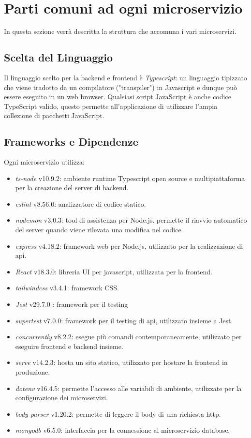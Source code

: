 \documentclass{report}
\begin{document}
\section{Parti comuni ad ogni microservizio}

In questa sezione verrà descritta la struttura che accomuna i vari microservizi.

\subsection{Scelta del Linguaggio}

Il linguaggio scelto per la backend e frontend è \textit{Typescript}: un linguaggio tipizzato che viene tradotto da un compilatore ("transpiler") in Javascript e dunque può essere eseguito in un web browser. Qualsiasi script JavaScript è anche codice TypeScript valido, questo permette all'applicazione di utilizzare l'ampia collezione di pacchetti JavaScript.

\subsection{Frameworks e Dipendenze}

Ogni microservizio utilizza:
\begin{itemize}
	\item \textit{ts-node} v10.9.2: ambiente runtime Typescript open source e multipiattaforma per la creazione del server di backend.
	\item \textit{eslint} v8.56.0: analizzatore di codice statico.
	\item \textit{nodemon} v3.0.3: tool di assistenza per Node.js. permette il riavvio automatico del server quando viene rilevata una modifica nel codice.
	\item \textit{express} v4.18.2: framework web per Node.js, utilizzato per la realizzazione di api.
	\item \textit{React} v18.3.0: libreria UI per javascript, utilizzata per la frontend.
	\item \textit{tailwindcss} v3.4.1: framework CSS.
	\item \textit{Jest} v29.7.0 : framework per il testing
	\item \textit{supertest} v7.0.0: framework per il testing di api, utilizzato insieme a Jest. 
	\item \textit{concurrently} v8.2.2: esegue più comandi contemporaneamente, utilizzato per eseguire frontend e backend insieme.
	\item \textit{serve} v14.2.3: hosta un sito statico, utilizzato per hostare la frontend in produzione.
	\item \textit{dotenv} v16.4.5: permette l'accesso alle variabili di ambiente, utilizzate per la configurazione dei microservizi.
	\item \textit{body-parser} v1.20.2: permette di leggere il body di una richiesta http.
	\item \textit{mongodb} v6.5.0: interfaccia per la connessione al microservizio database.
\end{itemize}
\end{document}
